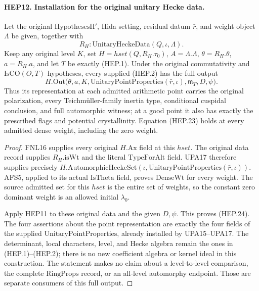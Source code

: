 \paragraph{HEP12. Installation for the original unitary Hecke data.}
\label{claim:HEP12}
Let the original $\mathrm{HypothesesH'}$, Hida setting, residual
datum $\bar r$, and weight object $\Lambda$ be given, together with
\[
                 R_H:\mathrm{UnitaryHeckeData}(Q,\iota,\Lambda).
\]
Keep any original level $K$, set
$H=hset(Q,R_H.\tau_0)$, $A=\Lambda.\Lambda$,
$\theta=R_H.\theta$, $a=R_H.a$, and let $T$ be exactly (HEP.1).
Under the original commutativity and $\mathrm{IsCO}(O,T)$ hypotheses,
every supplied (HEP.2) has the full output
\[
 H.\mathrm{Out}\bigl(\theta,a,K,
       \mathrm{UnitaryPointProperties}(\bar r,\iota),
       \mathfrak m_T,D,\psi\bigr).
 \tag{HEP.24}
\]
Thus its representation at each admitted arithmetic point carries
the original polarization, every Teichm\"uller-family inertia type,
conditional cuspidal conclusion, and full automorphic witness;
at a good point it also has exactly the prescribed flags and
potential crystallinity.  Equation (HEP.23) holds at every admitted
dense weight, including the zero weight.
\begin{proof}
FNL16 supplies every original $H.\mathrm{Ax}$ field at this
$hset$.  The original data record supplies
$R_H.\mathrm{isWt}$ and the literal $\mathrm{TypeForAlt}$ field.
UPA17 therefore supplies precisely
$H.\mathrm{AutomorphicHeckeSet}
(\iota,\mathrm{UnitaryPointProperties}(\bar r,\iota))$.
AFS5, applied to its actual $\mathrm{IsTheta}$ field, proves
$\mathrm{DenseWt}$ for every weight.  The source admitted set
for this $hset$ is the entire set of weights, so the constant zero
dominant weight is an allowed initial $\lambda_0$.

Apply HEP11 to these original data and the given $D,\psi$.
This proves (HEP.24).  The four assertions about the point
representation are exactly the four fields of the supplied
$\mathrm{UnitaryPointProperties}$, already installed by UPA15--UPA17.
The determinant, local characters, level, and Hecke algebra remain
the ones in (HEP.1)--(HEP.2); there is no new coefficient algebra
or kernel ideal in this construction.  The statement makes no
claim about a level-to-level comparison, the complete
$\mathrm{RingProps}$ record, or an all-level automorphy endpoint.
Those are separate consumers of this full output.
\end{proof}
